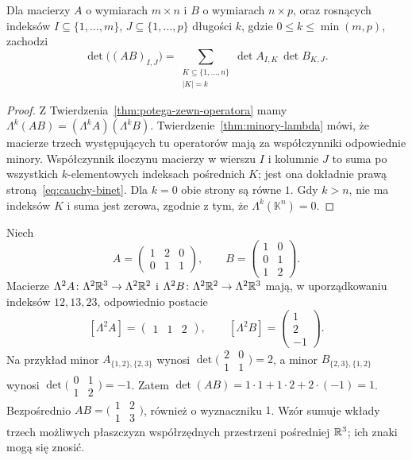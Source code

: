 \begin{wniosek}
\label{cor:cauchy-binet}
Dla macierzy $A$ o wymiarach $m\times n$ i $B$ o wymiarach
$n\times p$, oraz rosnących indeksów $I\subseteq\{1,\ldots,m\}$,
$J\subseteq\{1,\ldots,p\}$ długości $k$, gdzie $0\leq k\leq\min(m,p)$,
zachodzi
\begin{equation}\label{eq:cauchy-binet}
 \det\bigl((AB)_{I,J}\bigr)
 =\sum_{\substack{K\subseteq\{1,\ldots,n\}\\ |K|=k}}
 \det A_{I,K}\,\det B_{K,J}.
\end{equation}
\end{wniosek}
\begin{proof}
Z Twierdzenia~\ref{thm:potega-zewn-operatora} mamy
$\Lambda^k(AB)=(\Lambda^k A)(\Lambda^k B)$.
Twierdzenie~\ref{thm:minory-lambda} mówi, że macierze
trzech występujących tu operatorów mają za współczynniki
odpowiednie minory. Współczynnik iloczynu macierzy w
wierszu $I$ i kolumnie $J$ to suma po wszystkich
$k$-elementowych indeksach pośrednich $K$; jest ona
dokładnie prawą stroną~\eqref{eq:cauchy-binet}.
Dla $k=0$ obie strony są równe $1$. Gdy $k>n$,
nie ma indeksów $K$ i suma jest zerowa, zgodnie z tym,
że $\Lambda^k(\mathbb K^n)=0$.
\end{proof}

\begin{przyklad}
Niech
\[
 A=\begin{pmatrix}1&2&0\\0&1&1\end{pmatrix},\qquad
 B=\begin{pmatrix}1&0\\0&1\\1&2\end{pmatrix}.
\]
Macierze $\Lambda^2A\colon\Lambda^2\mathbb{R}^3\to\Lambda^2\mathbb{R}^2$
i $\Lambda^2B\colon\Lambda^2\mathbb{R}^2\to\Lambda^2\mathbb{R}^3$ mają,
w uporządkowaniu indeksów $12,13,23$, odpowiednio postacie
\[
 [\Lambda^2A]=\begin{pmatrix}1&1&2\end{pmatrix},\qquad
 [\Lambda^2B]=\begin{pmatrix}1\\2\\-1\end{pmatrix}.
\]
Na przykład minor $A_{\{1,2\},\{2,3\}}$ wynosi
$\det\bigl(\begin{smallmatrix}2&0\\1&1\end{smallmatrix}\bigr)=2$,
a minor $B_{\{2,3\},\{1,2\}}$ wynosi
$\det\bigl(\begin{smallmatrix}0&1\\1&2\end{smallmatrix}\bigr)=-1$.
Zatem $\det(AB)=1\cdot1+1\cdot2+2\cdot(-1)=1$.
Bezpośrednio $AB=\bigl(\begin{smallmatrix}1&2\\1&3\end{smallmatrix}\bigr)$,
również o wyznaczniku $1$. Wzór sumuje wkłady trzech
możliwych płaszczyzn współrzędnych przestrzeni pośredniej $\mathbb{R}^3$;
ich znaki mogą się znosić.
\end{przyklad}

